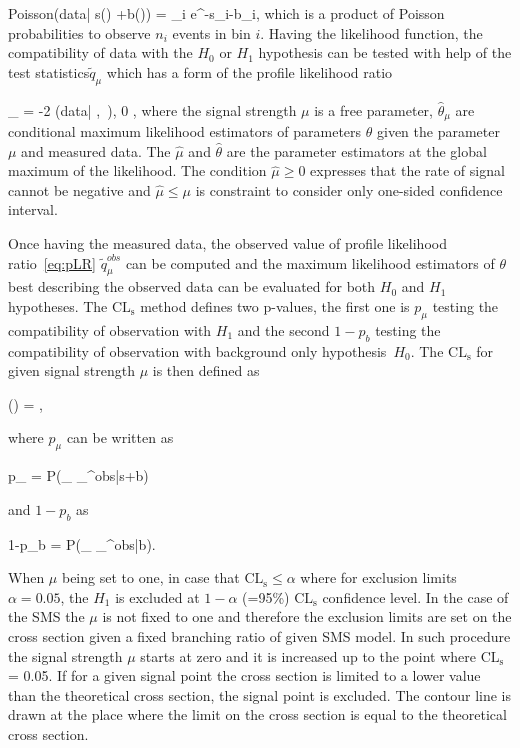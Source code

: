 {
Poisson(data| \mu s(\theta) +b(\theta))  = \prod_{i}  e^{-\mu s_{i}-b_{i}},
}
which is a product  of Poisson probabilities to observe $n_{i}$ events in bin $i$. Having the likelihood function, the compatibility of data with the $H_{0}$ or $H_{1}$ hypothesis can be tested with help of the test statistics$\tilde{q}_{\mu}$ which has a form of the profile likelihood ratio

{
_{\mu} = -2   {(data| \hat{\mu} ,~\hat{\theta})}, 0 \leq \hat{\mu} \leq \mu ,
}
where the signal strength $\mu$ is a free parameter, $\hat{\theta}_{\mu}$ are conditional maximum likelihood estimators of parameters $\theta$ given the parameter $\mu$ and measured data. The $\hat{\mu}$ and $\hat{\theta}$ are the parameter estimators at the global maximum of the likelihood. The condition $\hat{\mu} \geq 0 $ expresses that the rate of signal cannot be negative and $\hat{\mu} \leq \mu $ is constraint to consider only one-sided confidence interval.
	  
Once having the measured data, the observed value of profile likelihood ratio~\ref{eq:pLR} $\tilde{q}_{\mu}^{obs}$ can be computed and the maximum likelihood estimators of $\theta$ best describing the observed data can be evaluated for both $H_{0}$ and $H_{1}$ hypotheses. The $\mathrm{CL_{s}}$  method defines two p-values, the first one is $p_{\mu}$ testing the compatibility of observation with $H_{1}$ and the second $1-p_{b}$ testing the compatibility of observation with background only hypothesis~$H_{0}$. The $\mathrm{CL_{s}}$ for given signal strength $\mu$ is then defined as

{
(\mu) = ,
}

where $p_{\mu}$ can be written as

{
p_{\mu} = P(_{\mu} \geq {}_{\mu}^{obs}|s+b)
}

and $1-p_{b}$ as

{
1-p_{b} = P(_{\mu} \geq {}_{\mu}^{obs}|b).
}

When $\mu$ being set to one, in case that $\mathrm{CL_{s}} \leq \alpha$ where for exclusion limits $\alpha = 0.05$, the $H_{1}$ is excluded at $1-\alpha$ (=95\%) $\mathrm{CL_{s}}$ confidence level. In the case of the  SMS the $\mu$ is not fixed to one and therefore the exclusion limits are set on the cross section given a fixed branching ratio of given SMS model. In such procedure the signal strength $\mu$ starts at zero and it is increased up to the point where $\mathrm{CL_{s}}$ = 0.05. If for a given signal point the cross section is limited to a lower value than the theoretical cross section, the signal point is excluded. The contour line is drawn at the place where the limit on the cross section is equal to the theoretical cross section.

